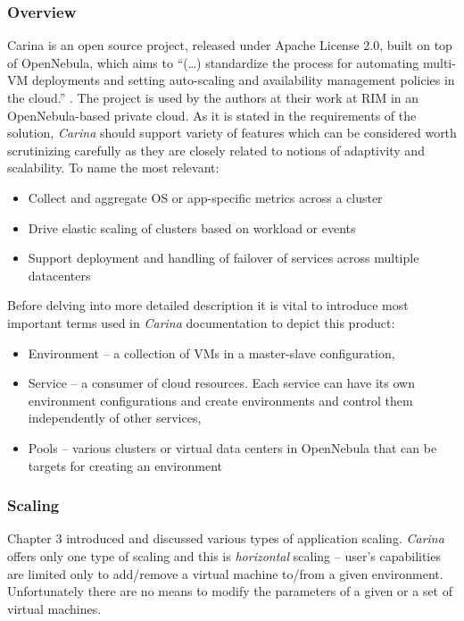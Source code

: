 \subsubsection{Overview}
Carina is an open source project, released under Apache License 2.0, built on top of OpenNebula, which aims to ``(\ldots) standardize the process for automating multi-VM deployments and setting auto-scaling and availability management policies in the cloud.'' \cite{CarinaBlog}. The project is used by the authors at their work at RIM in an OpenNebula-based private cloud.
As it is stated in the requirements of the solution, \emph{Carina} should support variety of features which can be considered worth scrutinizing carefully as they are closely related to notions of adaptivity and scalability. To name the most relevant: \cite{CarinaBlog}
\begin{itemize}
  \item Collect and aggregate OS or app-specific metrics across a cluster
  \item Drive elastic scaling of clusters based on workload or events
  \item Support deployment and handling of failover of services across multiple datacenters
\end{itemize}

Before delving into more detailed description it is vital to introduce most important terms used in \emph{Carina} documentation to depict this product:
\begin{itemize}
  \item Environment -- a collection of VMs in a master-slave configuration,
  \item Service -- a consumer of cloud resources. Each service can have its own environment configurations and create environments and control them independently of other services,
  \item Pools -- various clusters or virtual data centers in OpenNebula that can be targets for creating an environment
\end{itemize}

\subsubsection{Scaling}
Chapter 3 introduced and discussed various types of application scaling. \emph{Carina} offers only one type of scaling and this is \emph{horizontal} scaling -- user's capabilities are limited only to add/remove a virtual machine to/from a given environment. Unfortunately there are no means to modify the parameters of a given or a set of virtual machines.

